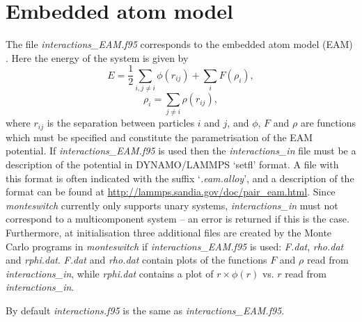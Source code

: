 \documentclass{report}
\begin{document}
\section{Embedded atom model}
The file \emph{interactions\_EAM.f95} corresponds to the embedded atom model (EAM) \cite{Daw_1984}. Here the energy of the system 
is given by
\begin{equation}
E = \frac{1}{2}\sum_{i,j\neq i}\phi(r_{ij}) + \sum_iF(\rho_i),
\end{equation}
\begin{equation}
\rho_i=\sum_{j\neq i}\rho(r_{ij}),
\end{equation}
where $r_{ij}$ is the separation between particles $i$ and $j$, and $\phi$, $F$ and $\rho$ are functions which must be specified
and constitute the parametrisation of the EAM potential. If \emph{interactions\_EAM.f95} is used then the \emph{interactions\_in}
file must be a description of the potential in DYNAMO/LAMMPS `setfl' format. A file with this format is often indicated with the 
suffix `\emph{.eam.alloy}', and a description of the format can be found at \url{http://lammps.sandia.gov/doc/pair\_eam.html}. 
Since \emph{monteswitch} currently only supports unary systems, \emph{interactions\_in} must not correspond to a 
multicomponent system -- an error is returned if this is the case. Furthermore, at initialisation three additional files are created by the
Monte Carlo programs in \emph{monteswitch} if \emph{interactions\_EAM.f95} is used: \emph{F.dat}, \emph{rho.dat} and \emph{rphi.dat}. 
\emph{F.dat} and \emph{rho.dat} contain plots of the functions $F$ and $\rho$ read from \emph{interactions\_in}, while 
\emph{rphi.dat} contains a plot of $r\times\phi(r)$ vs. $r$ read from \emph{interactions\_in}. 

By default \emph{interactions.f95} is the same as \emph{interactions\_EAM.f95}.
\end{document}
